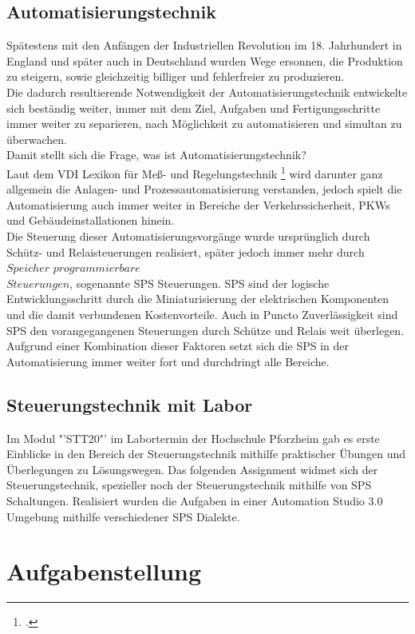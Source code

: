 \documentclass[12pt,a4paper]{scrartcl}	%
\begin{document}
\subsection{Automatisierungstechnik}
Spätestens mit den Anfängen der Industriellen Revolution im 18. Jahrhundert in England und später auch in Deutschland wurden Wege ersonnen, die Produktion zu steigern, sowie gleichzeitig billiger und fehlerfreier zu produzieren.\\
Die dadurch resultierende Notwendigkeit der Automatisierungstechnik entwickelte sich beständig weiter, immer mit dem Ziel, Aufgaben und Fertigungsschritte immer weiter zu separieren, nach Möglichkeit zu automatisieren und simultan zu überwachen.\\
Damit stellt sich die Frage, was ist Automatisierungstechnik?\\
Laut dem VDI Lexikon für Meß- und Regelungstechnik \footcite[vgl.][]{VDI}{} wird darunter ganz allgemein die Anlagen- und Prozessautomatisierung verstanden, jedoch spielt die Automatisierung auch immer weiter in Bereiche der Verkehrssicherheit, PKWs und Gebäudeinstallationen hinein.\\
Die Steuerung dieser Automatisierungsvorgänge wurde ursprünglich durch Schütz- und Relaisteuerungen realisiert, später jedoch immer mehr durch $Speicher$ $programmierbare$\\ $Steuerungen$, sogenannte SPS Steuerungen. SPS sind der logische Entwicklungsschritt durch die Miniaturisierung der elektrischen Komponenten und die damit verbundenen Kostenvorteile. Auch in Puncto Zuverlässigkeit sind SPS den vorangegangenen Steuerungen durch Schütze und Relais weit überlegen. Aufgrund einer Kombination dieser Faktoren setzt sich die SPS in der Automatisierung immer weiter fort und durchdringt alle Bereiche.

\subsection{Steuerungstechnik mit Labor}
Im Modul "'STT20"' im Labortermin der Hochschule Pforzheim gab es erste Einblicke in den Bereich der Steuerungstechnik mithilfe praktischer Übungen und Überlegungen zu Lösungswegen.
Das folgenden Assignment widmet sich der Steuerungstechnik, spezieller noch der Steuerungstechnik mithilfe von SPS Schaltungen. Realisiert wurden die Aufgaben in einer Automation Studio 3.0 Umgebung mithilfe verschiedener SPS Dialekte.
\newpage
\section{Aufgabenstellung} 
\end{document}

